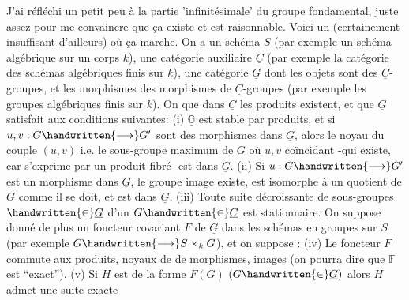 J'ai réfléchi un petit peu à la partie 'infinitésimale' du groupe fondamental, juste assez pour me convaincre que ça existe et est raisonnable. Voici un  (certainement insuffisant d'ailleurs) où ça marche. On a un schéma $S$ (par exemple un schéma algébrique sur un corps $k$), une catégorie auxiliaire $\underline{C}$ (par exemple la catégorie des schémas algébriques finis sur $k$), une catégorie  $\underline{G}$ dont les objets sont des $\underline{C}$-groupes, et les morphismes des morphismes de $\underline{C}$-groupes (par exemple les groupes algébriques finis sur $k$). On  que dans $\underline{C}$ les produits  existent, et que $\underline{G}$ satisfait aux conditions suivantes: (i) $\underline{\mathbb{G}}$ est stable par produits, et si $u,v:G\handwritten{\longrightarrow}G'$ sont des morphismes dans $\underline{G}$, alors le noyau du couple $(u,v)$ i.e. le sous-groupe  maximum de $G$ où $u,v$ coïncidant -qui existe, car s'exprime par un produit fibré- est dans $\underline{G}$. (ii) Si $u:G\handwritten{\longrightarrow}G'$ est un morphisme dans $\underline{G}$,  le groupe image existe, est isomorphe à un quotient de $G$ comme il se doit, et est dans $\underline{G}$. (iii) Toute suite décroissante de sous-groupes  $\handwritten{\in}\underline{G}$ d'un $G\handwritten{\in}\underline{C}$ est stationnaire. On suppose donné de plus un foncteur covariant  $F$ de $\underline{G}$ dans les  schémas en groupes sur $S$ (par exemple $G\handwritten{\longrightarrow}S\mathbin{\times}_{k}G$), et on suppose : (iv) Le foncteur $F$ commute aux produits,  noyaux de  de morphismes, images (on pourra dire que $\mathbb{F}$ est ``exact''). (v) Si $H$ est  de la forme $F(G)$ $(G\handwritten{\in}\underline{G})$ alors $H$ admet une suite exacte
